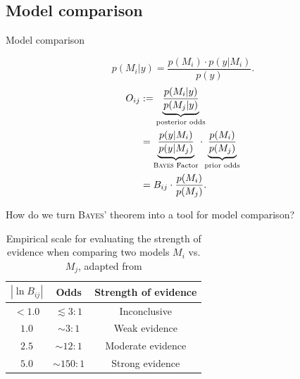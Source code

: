 \documentclass[11pt,aspectratio=1610,dvipsnames]{beamer}
\begin{document}
\subsection{Model comparison}
\begin{frame}{Model comparison}

	
	\begin{minipage}{.48\linewidth}
		\begin{tcolorbox}[colback=black!5,colframe=gray!15!black,title=\textsc{Bayes} factor] 
			\begin{equation}
			p(M_i|y)=\frac{p(M_i)\cdot p(y|M_i)}{p(y)}.
			\end{equation}
			\begin{align}\label{eq:bf}
			\begin{split}
			O_{ij}&:=\underbrace{\frac{p(M_i|y)}{p(M_j|y)}}_{\text{posterior odds}}\\&=\underbrace{\frac{p(y|M_i)}{p(y|M_j)}}_{\text{\textsc{Bayes} Factor}}\cdot\underbrace{\frac{p(M_i)}{p(M_j)}}_{\text{prior odds}}\\&=B_{ij}\cdot\frac{p(M_i)}{p(M_j)}.
			\end{split}
			\end{align}
		\end{tcolorbox}
	\end{minipage}
\hfil
\begin{minipage}{.45\linewidth}
		How do we turn \textsc{Bayes'} theorem into a tool for model comparison?
	\begin{table}[htbp]
		
		\centering
		{\renewcommand{\arraystretch}{1.3}
			\begin{tabular}{|c|c|c|}
				\hline
				$|\ln B_{ij}|$& Odds  & Strength of evidence \\
				\hline
				$< 1.0$& $ \lesssim 3:1$  & Inconclusive  \\
				$1.0$ & $\sim 3:1$  & Weak evidence  \\
				$2.5$& $\sim 12:1$  & Moderate evidence \\
				$5.0$& $\sim 150:1$ & Strong evidence \\
				\hline
		\end{tabular}}
		\caption{Empirical scale for evaluating the strength of evidence when comparing two models $M_i$ vs. $M_j$, adapted from \citet{Trotta_2008}}
		\label{tab:bf}
	\end{table}
\end{minipage}
	




\end{frame}
\end{document}
